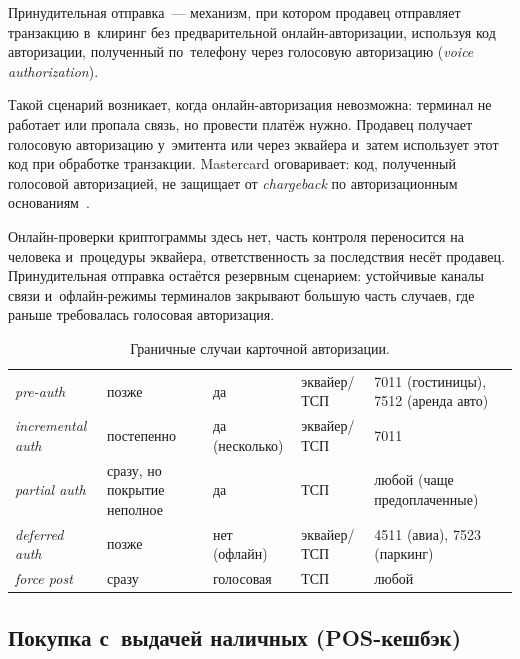 Принудительная отправка~--- механизм, при котором продавец отправляет
транзакцию в~клиринг без предварительной онлайн-авторизации, используя код
авторизации, полученный по~телефону через голосовую авторизацию (\textit{voice
authorization}).

Такой сценарий возникает, когда онлайн-авторизация невозможна: терминал не
работает или пропала связь, но провести платёж нужно. Продавец получает голосовую
авторизацию у~эмитента или через эквайера и~затем использует этот код при
обработке транзакции. Mastercard оговаривает: код, полученный голосовой
авторизацией, не защищает от \textit{chargeback} по
авторизационным основаниям~\cite{mc-tpr}.

Онлайн-проверки криптограммы здесь нет, часть контроля переносится на человека
и~процедуры эквайера, ответственность за последствия несёт продавец.
Принудительная отправка остаётся резервным сценарием: устойчивые каналы связи
и~офлайн-режимы терминалов закрывают большую часть случаев, где раньше
требовалась голосовая авторизация.

\begin{table}[htbp]
  \caption{Граничные случаи карточной авторизации.}\label{tab:tx-edge-cases}
  \begingroup
  \tablesetup
  \begin{tabularx}{\textwidth}{
      @{}B{0.14\textwidth}
      P{0.17\textwidth}
      P{0.15\textwidth}
      P{0.17\textwidth}
      Y@{}
    }
    \toprule
    \headrow
     &  &
     &  &
     \\
    \midrule
    \textit{pre-auth} & позже & да
    & эквайер/ТСП & 7011 (гостиницы), 7512 (аренда авто) \\
    \rowsep
    \textit{incremental auth} & постепенно & да (несколько)
    & эквайер/ТСП & 7011 \\
    \rowsep
    \textit{partial auth} & сразу, но покрытие неполное & да
    & ТСП & любой (чаще предоплаченные) \\
    \rowsep
    \textit{deferred auth} & позже & нет (офлайн)
    & эквайер/ТСП & 4511 (авиа), 7523 (паркинг) \\
    \rowsep
    \textit{force post} & сразу & голосовая
    & ТСП & любой \\
    \bottomrule
  \end{tabularx}\par
  \endgroup
\end{table}

\subsection*{Покупка с~выдачей наличных (POS-кешбэк)}\label{sec:tx-pos-cashback}

